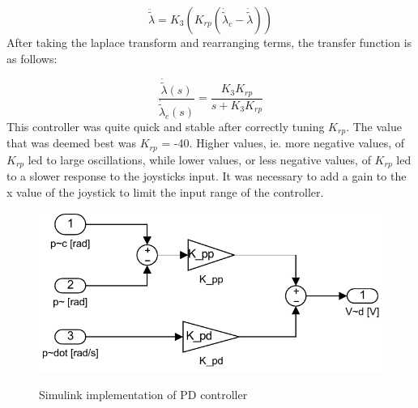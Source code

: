 \begin{equation}
\label{eq:p controller in travel EoM}
\ddot{\tilde{\lambda}} = K_3(K_{rp}(\dot{\tilde{\lambda}}_c -
\dot{\tilde{\lambda}}))
\end{equation}
After taking the laplace transform and rearranging terms, the transfer
function is as follows:

\begin{equation}
\label{eq:Transfer function between travel and desired travel}
\frac{\dot{\tilde{\lambda}}(s)}{\dot{\tilde{\lambda}}_c(s)} = \frac{K_3K_{rp}}{s + K_3K_{rp}}
\end{equation}
This controller was quite quick and stable after correctly tuning
$K_{rp}$. The value that was deemed best was $K_{rp}$ = -40. Higher
values, ie. more negative values, of $K_{rp}$ led to large
oscillations, while lower values, or less negative values, of $K_{rp}$
led to a slower response to the joysticks input.  It was necessary
to add a gain to the x value of the joystick to limit the input range
of the controller.

\begin{figure}
\caption{Simulink implementation of PD controller}
	\centering
		\includegraphics{images/pd_pitch_control.pdf}
	\label{fig:Pitch controller}
\end{figure}


